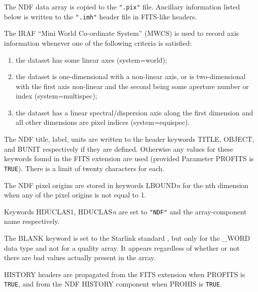 \documentclass[twoside,11pt]{starlink}
\begin{document}
{{{         \sstitem
         The NDF data array is copied to the \texttt{".pix"} file.  Ancillary
         information listed below is written to the \texttt{".imh"} header
         file in FITS-like headers.

         \sstitem
         The IRAF ``Mini World Co-ordinate System'' (MWCS) is used to
         record axis information whenever one of the following criteria is
         satisfied:

         \begin{enumerate}
            \item the dataset has some linear axes (system=world);

            \item the dataset is one-dimensional with a non-linear axis, or is
            two-dimensional with the first axis non-linear and the
            second being some aperture number or index
            (system=multispec);

            \item the dataset has a linear spectral/dispersion axis along the
            first dimension and all other dimensions are pixel indices
            (system=equispec).
         \end{enumerate}

         \sstitem
         The NDF title, label, units are written to the header keywords
         TITLE, OBJECT, and BUNIT respectively if they are defined.
         Otherwise any values for these keywords found in the FITS
         extension are used (provided Parameter PROFITS is \texttt{TRUE}).
         There is a limit of twenty characters for each.

         \sstitem
         The NDF pixel origins are stored in keywords LBOUND\textit{n} for the
         nth dimension when any of the pixel origins is not equal to 1.

         \sstitem
         Keywords HDUCLAS1, HDUCLAS\textit{n} are set to \texttt{"NDF"} and the
         array-component name respectively.

         \sstitem
         The BLANK keyword is set to the Starlink standard
         ,
         but only for the \_WORD data type and not for a quality array.  It
         appears regardless of whether or not there are bad values
         actually present in the array.

         \sstitem
         HISTORY headers are propagated from the FITS extension when
         PROFITS is \texttt{TRUE}, and from the NDF HISTORY component when
         PROHIS is \texttt{TRUE}.

}}}
\end{document}
